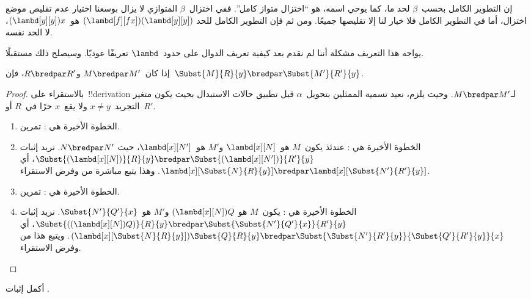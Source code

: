 \documentclass[../../../include/open-logic-section]{subfiles}
\begin{document}
إن التطوير الكامل بحسب~$\beta$ لحد ما، كما يوحي اسمه، هو ``اختزال
متواز كامل''. ففي اختزال~$\beta$ المتوازي لا يزال بوسعنا اختيار عدم
تقليص موضع اختزال، أما في التطوير الكامل فلا خيار لنا إلا تقليصها
جميعًا. ومن ثم فإن التطوير الكامل للحد
$(\lambd[f][fx])(\lambd[y][y])$ هو~$(\lambd[y][y])x$، لا الحد نفسه.

\begin{editorial}
  يواجه هذا التعريف مشكلة أننا لم نقدم بعد كيفية تعريف الدوال على
  حدود~$\lambd$ تعريفًا عوديًا. وسيصلح ذلك مستقبلًا.
\end{editorial}

\begin{lem}
  إذا كان~$M \bredpar M'$ و$R \bredpar R'$، فإن~$\Subst{M}{R}{y}
  \bredpar \Subst{M'}{R'}{y}$.
\end{lem}

\begin{proof}
  بالاستقراء على~!!{derivation} لـ$M \bredpar M'$. وحيث يلزم، نعيد
  تسمية الممثلين بتحويل~$\alpha$ قبل تطبيق حالات الاستبدال بحيث يكون
  متغير التجريد~$x \ne y$ ولا يقع~$x$ حرًا في~$R$ أو~$R'$.
  \begin{enumerate}
    \item الخطوة الأخيرة هي : تمرين.
    \item الخطوة الأخيرة هي : عندئذ يكون~$M$
      هو~$\lambd[x][N]$ و$M'$ هو~$\lambd[x][N']$، حيث
      $N \bredpar N'$. نريد إثبات
      $\Subst{(\lambd[x][N])}{R}{y} \bredpar
      \Subst{(\lambd[x][N'])}{R'}{y}$، أي
      $\lambd[x][\Subst{N}{R}{y}] \bredpar
      \lambd[x][\Subst{N'}{R'}{y}]$. وهذا يتبع مباشرة من
       وفرض الاستقراء.
    \item الخطوة الأخيرة هي : تمرين.
    \item الخطوة الأخيرة هي : يكون~$M$ هو
      $(\lambd[x][N])Q$ و$M'$ هو~$\Subst{N'}{Q'}{x}$. نريد إثبات
      $\Subst{((\lambd[x][N])Q)}{R}{y} \bredpar
      \Subst{\Subst{N'}{Q'}{x}}{R'}{y}$، أي
      $(\lambd[x][\Subst{N}{R}{y}])\Subst{Q}{R}{y} \bredpar
      \Subst{\Subst{N'}{R'}{y}}{\Subst{Q'}{R'}{y}}{x}$. ويتبع هذا
      من  وفرض الاستقراء.
  \end{enumerate}
\end{proof}

\begin{prob}
  أكمل إثبات .
\end{prob}
\end{document}
